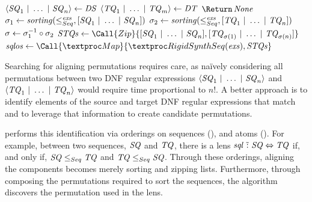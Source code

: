 \documentclass[acmsmall]{acmart}
\begin{document}
\begin{algorithm}
\begin{algorithmic}[1]
    \Function{\RigidSynth}{$\DNFRegex,\DNFRegexAlt,\Examples$}
    \State $\langle\mathit{SQ}_1 ~|~ \ldots ~|~ \mathit{SQ}_n\rangle \gets
    \mathit{DS}$
    \State $\langle\mathit{TQ}_1 ~|~ \ldots ~|~ \mathit{TQ}_m\rangle \gets
    \mathit{DT}$
    \State $\ReturnVal{\None}$
    \EndIf
    \State $\sigma_1 \gets
    \mathit{sorting}(\leq_{Seq}^{\mathit{exs}},[ \mathit{SQ}_1 ~|~ \ldots
        ~|~ \mathit{SQ}_n ])$
    \State $\sigma_2 \gets
    \mathit{sorting}(\leq_{Seq}^{\mathit{exs}},[ \mathit{TQ}_1 ~|~ \ldots
        ~|~ \mathit{TQ}_n ])$
    \State $\sigma \gets \sigma_1^{-1} \circ \sigma_2$
    \State $\mathit{STQs} \gets
    \Call{Zip}{\ListOf{\Sequence_1 \DNFSep \ldots \DNFSep
        \Sequence_n},\ListOf{\SequenceAlt_{\sigma(1)} \DNFSep \ldots \DNFSep \SequenceAlt_{\sigma(n)}}}$
    \State $\mathit{sqlos} \gets
    \Call{\Map}{\RigidSynthSequence(\Examples),\mathit{STQs}}$
    \EndCaseTwo
    \CaseTwo {\None}{$\ReturnVal{\None}$}
    \EndCaseTwo
    \EndSwitch
    \EndFunction
  \end{algorithmic}
\end{algorithm}

Searching for aligning permutations requires care, as na\"{i}vely
considering all permutations between two DNF regular
expressions $\langle\mathit{SQ}_1 ~|~ \ldots ~|~ \mathit{SQ}_n\rangle$ and
$\langle\mathit{TQ}_1 ~|~ \ldots ~|~ \mathit{TQ}_n\rangle$ would require time
proportional to $n!$.  A better approach is to identify elements of
the source and target DNF regular expressions that match and to
leverage that information to create candidate permutations.

\RigidSynth{} performs this identification via orderings on
sequences (\SequenceLeq), and atoms (\AtomLeq).  For
example, between two sequences, $\mathit{SQ}$ and $\mathit{TQ}$, there is a lens
$\mathit{sql} \,\,\tilde{:}\,\, \mathit{SQ} \Leftrightarrow \mathit{TQ}$ if,
and only if, $\mathit{SQ} \leq_{Seq} \mathit{TQ}$ and $\mathit{TQ}
\leq_{Seq} \mathit{SQ}$.  Through these orderings, aligning the components
becomes merely sorting and zipping lists.  Furthermore, through composing the
permutations required to sort the sequences, the algorithm discovers the
permutation used in the lens.
\end{document}
